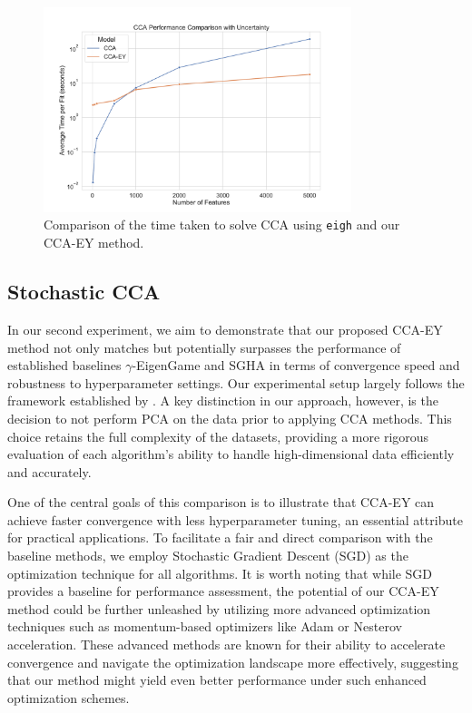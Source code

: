 \begin{figure}
    \centering
    \includegraphics[width=0.8\textwidth]{figures/benchmarks/cca_comparison_log}
    \caption{Comparison of the time taken to solve CCA using \texttt{eigh} and our CCA-EY method.}
    \label{fig:cca-comparison}
\end{figure}

\subsection{Stochastic CCA}
In our second experiment, we aim to demonstrate that our proposed CCA-EY method not only matches but potentially surpasses the performance of established baselines $\gamma$-EigenGame and SGHA in terms of convergence speed and robustness to hyperparameter settings.
Our experimental setup largely follows the framework established by \citet{meng2021online, gemp2022generalized}.
A key distinction in our approach, however, is the decision to not perform PCA on the data prior to applying CCA methods.
This choice retains the full complexity of the datasets, providing a more rigorous evaluation of each algorithm's ability to handle high-dimensional data efficiently and accurately.

One of the central goals of this comparison is to illustrate that CCA-EY can achieve faster convergence with less hyperparameter tuning, an essential attribute for practical applications.
To facilitate a fair and direct comparison with the baseline methods, we employ Stochastic Gradient Descent (SGD) as the optimization technique for all algorithms.
It is worth noting that while SGD provides a baseline for performance assessment, the potential of our CCA-EY method could be further unleashed by utilizing more advanced optimization techniques such as momentum-based optimizers like Adam or Nesterov acceleration.
These advanced methods are known for their ability to accelerate convergence and navigate the optimization landscape more effectively, suggesting that our method might yield even better performance under such enhanced optimization schemes.

